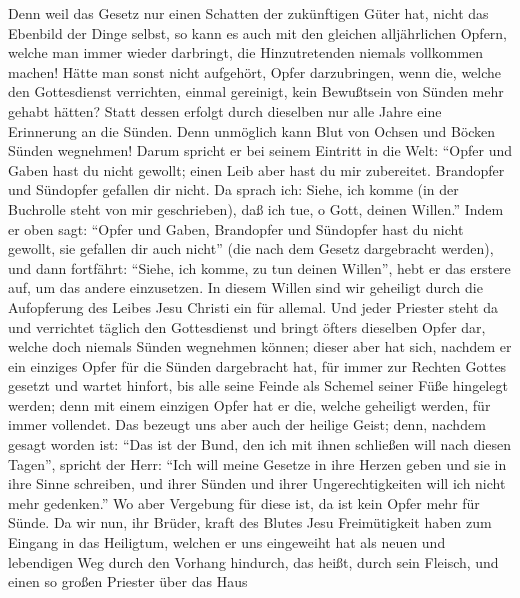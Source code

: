  Denn weil das Gesetz nur einen Schatten der zukünftigen
Güter hat, nicht das Ebenbild der Dinge selbst, so kann es auch mit den
gleichen alljährlichen Opfern, welche man immer wieder darbringt, die
Hinzutretenden niemals vollkommen machen!  Hätte man sonst
nicht aufgehört, Opfer darzubringen, wenn die, welche den Gottesdienst
verrichten, einmal gereinigt, kein Bewußtsein von Sünden mehr gehabt
hätten?  Statt dessen erfolgt durch dieselben nur alle
Jahre eine Erinnerung an die Sünden.  Denn unmöglich kann
Blut von Ochsen und Böcken Sünden wegnehmen!  Darum
spricht er bei seinem Eintritt in die Welt: ``Opfer und Gaben hast du
nicht gewollt; einen Leib aber hast du mir zubereitet. 
Brandopfer und Sündopfer gefallen dir nicht.  Da sprach
ich: Siehe, ich komme (in der Buchrolle steht von mir geschrieben), daß
ich tue, o Gott, deinen Willen.''  Indem er oben sagt:
``Opfer und Gaben, Brandopfer und Sündopfer hast du nicht gewollt, sie
gefallen dir auch nicht'' (die nach dem Gesetz dargebracht werden),
 und dann fortfährt: ``Siehe, ich komme, zu tun deinen
Willen'', hebt er das erstere auf, um das andere einzusetzen.
 In diesem Willen sind wir geheiligt durch die
Aufopferung des Leibes Jesu Christi ein für allemal.  Und
jeder Priester steht da und verrichtet täglich den Gottesdienst und
bringt öfters dieselben Opfer dar, welche doch niemals Sünden wegnehmen
können;  dieser aber hat sich, nachdem er ein einziges
Opfer für die Sünden dargebracht hat, für immer zur Rechten Gottes
gesetzt  und wartet hinfort, bis alle seine Feinde als
Schemel seiner Füße hingelegt werden;  denn mit einem
einzigen Opfer hat er die, welche geheiligt werden, für immer vollendet.
 Das bezeugt uns aber auch der heilige Geist;
 denn, nachdem gesagt worden ist: ``Das ist der Bund, den
ich mit ihnen schließen will nach diesen Tagen'', spricht der Herr:
``Ich will meine Gesetze in ihre Herzen geben und sie in ihre Sinne
schreiben,  und ihrer Sünden und ihrer Ungerechtigkeiten
will ich nicht mehr gedenken.''  Wo aber Vergebung für
diese ist, da ist kein Opfer mehr für Sünde.  Da wir nun,
ihr Brüder, kraft des Blutes Jesu Freimütigkeit haben zum Eingang in das
Heiligtum,  welchen er uns eingeweiht hat als neuen und
lebendigen Weg durch den Vorhang hindurch, das heißt, durch sein
Fleisch,  und einen so großen Priester über das Haus

